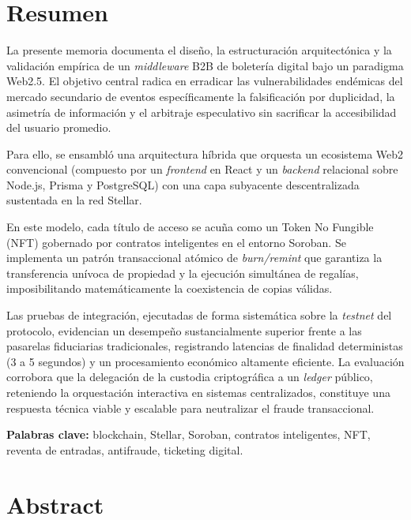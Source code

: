 \newpage
\section*{Resumen}

La presente memoria documenta el diseño, la estructuración arquitectónica y la validación empírica de un 
\textit{middleware} B2B de boletería digital bajo un paradigma Web2.5. El objetivo central radica en
erradicar las vulnerabilidades endémicas del mercado secundario de eventos específicamente la falsificación 
por duplicidad, la asimetría de información y el arbitraje especulativo sin sacrificar la accesibilidad 
del usuario promedio. 

Para ello, se ensambló una arquitectura híbrida que orquesta un ecosistema Web2 convencional (compuesto por
un \textit{frontend} en React y un \textit{backend} relacional sobre Node.js, Prisma y PostgreSQL) con 
una capa subyacente descentralizada sustentada en la red Stellar.

En este modelo, cada título de acceso se acuña como un Token No Fungible (NFT) gobernado por contratos
inteligentes 
en el entorno Soroban. Se implementa un patrón transaccional atómico de \textit{burn/remint} que garantiza la
transferencia 
unívoca de propiedad y la ejecución simultánea de regalías, imposibilitando matemáticamente la coexistencia
de copias válidas. 

Las pruebas de integración, ejecutadas de forma sistemática sobre la \textit{testnet} del protocolo,
evidencian 
un desempeño sustancialmente superior frente a las pasarelas fiduciarias tradicionales, registrando latencias
de 
finalidad deterministas (3 a 5 segundos) y un procesamiento económico altamente eficiente. La evaluación
corrobora 
que la delegación de la custodia criptográfica a un \textit{ledger} público, reteniendo la orquestación
interactiva 
en sistemas centralizados, constituye una respuesta técnica viable y escalable para neutralizar el fraude
transaccional.

\vspace{0.3cm}
\noindent\textbf{Palabras clave:} blockchain, Stellar, Soroban, contratos inteligentes, NFT, reventa de
entradas, 
antifraude, ticketing digital.

\newpage
\section*{Abstract}

